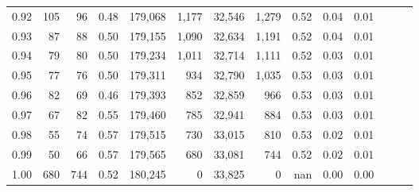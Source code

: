 \begin{tabular}{rrrrrrrrrrrrrr}
0.92 &    105 &   96 &  0.48 &  179,068 &    1,177 &  32,546 &   1,279 &  0.52 &  0.04 &      0.01 \\
0.93 &     87 &   88 &  0.50 &  179,155 &    1,090 &  32,634 &   1,191 &  0.52 &  0.04 &      0.01 \\
0.94 &     79 &   80 &  0.50 &  179,234 &    1,011 &  32,714 &   1,111 &  0.52 &  0.03 &      0.01 \\
0.95 &     77 &   76 &  0.50 &  179,311 &      934 &  32,790 &   1,035 &  0.53 &  0.03 &      0.01 \\
0.96 &     82 &   69 &  0.46 &  179,393 &      852 &  32,859 &     966 &  0.53 &  0.03 &      0.01 \\
0.97 &     67 &   82 &  0.55 &  179,460 &      785 &  32,941 &     884 &  0.53 &  0.03 &      0.01 \\
0.98 &     55 &   74 &  0.57 &  179,515 &      730 &  33,015 &     810 &  0.53 &  0.02 &      0.01 \\
0.99 &     50 &   66 &  0.57 &  179,565 &      680 &  33,081 &     744 &  0.52 &  0.02 &      0.01 \\
1.00 &    680 &  744 &  0.52 &  180,245 &        0 &  33,825 &       0 &   nan &  0.00 &      0.00 \\
\bottomrule
\end{tabular}
